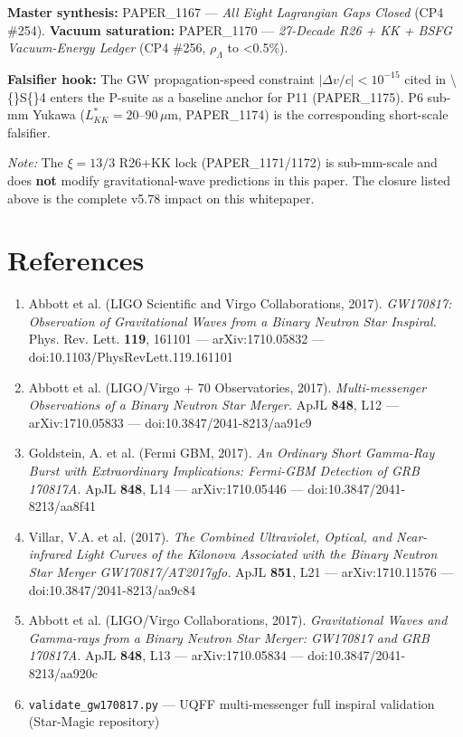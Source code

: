 \documentclass[11pt]{article}
\begin{document}
\textbf{Master synthesis:} PAPER\_1167 --- \emph{All Eight Lagrangian Gaps Closed} (CP4 \#254). \textbf{Vacuum saturation:} PAPER\_1170 --- \emph{27-Decade R26 + KK + BSFG Vacuum-Energy Ledger} (CP4 \#256, $\rho_\Lambda$ to <0.5\%).

\textbf{Falsifier hook:} The GW propagation-speed constraint $|\Delta v/c|<10^{-15}$ cited in \textbackslash\{\}S\{\}4 enters the P-suite as a baseline anchor for P11 (PAPER\_1175). P6 sub-mm Yukawa ($L_{KK}^*=20$--$90\,\mu$m, PAPER\_1174) is the corresponding short-scale falsifier.

\emph{Note:} The $\xi=13/3$ R26+KK lock (PAPER\_1171/1172) is sub-mm-scale and does \textbf{not} modify gravitational-wave predictions in this paper. The closure listed above is the complete v5.78 impact on this whitepaper.

\section*{References}

\begin{enumerate}
  \item Abbott et al. (LIGO Scientific and Virgo Collaborations, 2017). \emph{GW170817: Observation of Gravitational Waves from a Binary Neutron Star Inspiral.} Phys. Rev. Lett. \textbf{119}, 161101 --- arXiv:1710.05832 --- doi:10.1103/PhysRevLett.119.161101
  \item Abbott et al. (LIGO/Virgo + 70 Observatories, 2017). \emph{Multi-messenger Observations of a Binary Neutron Star Merger.} ApJL \textbf{848}, L12 --- arXiv:1710.05833 --- doi:10.3847/2041-8213/aa91c9
  \item Goldstein, A. et al. (Fermi GBM, 2017). \emph{An Ordinary Short Gamma-Ray Burst with Extraordinary Implications: Fermi-GBM Detection of GRB 170817A.} ApJL \textbf{848}, L14 --- arXiv:1710.05446 --- doi:10.3847/2041-8213/aa8f41
  \item Villar, V.A. et al. (2017). \emph{The Combined Ultraviolet, Optical, and Near-infrared Light Curves of the Kilonova Associated with the Binary Neutron Star Merger GW170817/AT2017gfo.} ApJL \textbf{851}, L21 --- arXiv:1710.11576 --- doi:10.3847/2041-8213/aa9c84
  \item Abbott et al. (LIGO/Virgo Collaborations, 2017). \emph{Gravitational Waves and Gamma-rays from a Binary Neutron Star Merger: GW170817 and GRB 170817A.} ApJL \textbf{848}, L13 --- arXiv:1710.05834 --- doi:10.3847/2041-8213/aa920c
  \item \verb|validate_gw170817.py| --- UQFF multi-messenger full inspiral validation (Star-Magic repository)
\end{enumerate}


\end{document}
